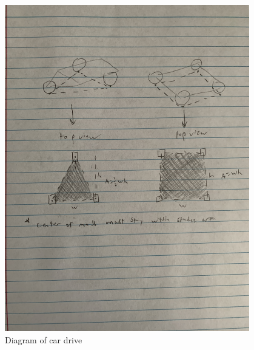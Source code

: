 \begin{figure}[ht]
\centering
\begin{minipage}[b]{.48\textwidth}
  \centering
  \includegraphics[width=0.95\textwidth]{Meetings/September/09-24-22/Hardware_Figure1.JPG}
  \caption{Diagram of car drive}
  \label{fig:pic1}
\end{minipage}%
\hfill%
\begin{minipage}[b]{.48\textwidth}
  \centering

\end{minipage}
\end{figure}
